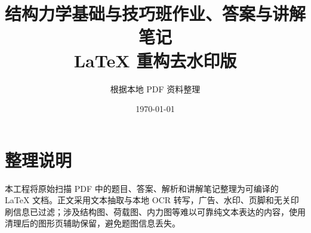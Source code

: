 \documentclass[UTF8,zihao=-4,openany]{ctexbook}
\title{结构力学基础与技巧班作业、答案与讲解笔记\\\large LaTeX 重构去水印版}
\author{根据本地 PDF 资料整理}
\date{\today}
\begin{document}
\maketitle
\frontmatter
\chapter*{整理说明}
本工程将原始扫描 PDF 中的题目、答案、解析和讲解笔记整理为可编译的 LaTeX 文档。正文采用文本抽取与本地 OCR 转写，广告、水印、页脚和无关印刷信息已过滤；涉及结构图、荷载图、内力图等难以可靠纯文本表达的内容，使用清理后的图形页辅助保留，避免题图信息丢失。
\tableofcontents
\mainmatter

































\backmatter
\end{document}

